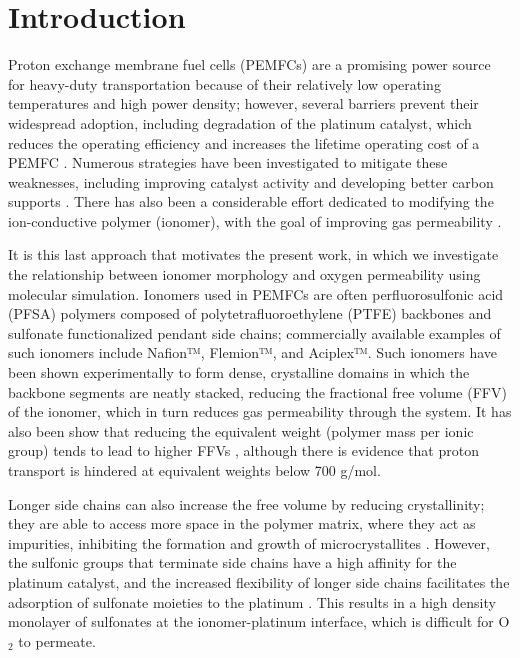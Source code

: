 \documentclass[journal=jacsat,manuscript=article]{achemso}
\begin{document}
\section{Introduction}
Proton exchange membrane fuel cells (PEMFCs) are a promising power source for heavy-duty transportation because of their relatively low operating temperatures and high power density; however, several barriers prevent their widespread adoption\cite{Cullen2021, pemfc-costing}, including degradation of the platinum catalyst, which reduces the operating efficiency and increases the lifetime operating cost of a PEMFC \cite{weber_critical_2014,braaten_studying_2020,bi_modeling_2008,ferreira_instability_2005,braaten_contaminant_2019}. Numerous strategies have been investigated to mitigate these weaknesses, including improving catalyst activity \cite{molmen_recent_2021,chandran_high-performance_2018,koh_effects_2008,he_single_2020} and developing better carbon supports \cite{ramaswamy_carbon_2020,yu_carbon-support_2009}. There has also been a considerable effort dedicated to modifying the ion-conductive polymer (ionomer), with the goal of improving gas permeability \cite{jomori_analysis_2012,Greszler_Caulk_Sinha_2012,sakai_analysis_2009,mohamed_effects_2009}. 

It is this last approach that motivates the present work, in which we investigate the relationship between ionomer morphology and oxygen permeability using molecular simulation. Ionomers used in PEMFCs are often perfluorosulfonic acid (PFSA) polymers composed of polytetrafluoroethylene (PTFE) backbones and sulfonate functionalized pendant side chains; commercially available examples of such ionomers include Nafion™, Flemion™, and Aciplex™. Such ionomers have been shown experimentally to form dense, crystalline domains in which the backbone segments are neatly stacked\cite{modestino_controlling_2012, ludvigsson_crystallinity_2000}, reducing the fractional free volume (FFV) of the ionomer, which in turn reduces gas permeability through the system. It has also been show that reducing the equivalent weight (polymer mass per ionic group) tends to lead to higher FFVs \cite{wang_evaluation_2012}, although there is evidence that proton transport is hindered at equivalent weights below 700 g/mol\cite{giffin_interplay_2013}. 

Longer side chains can also increase the free volume by reducing crystallinity; they are able to access more space in the polymer matrix, where they act as impurities, inhibiting the formation and growth of microcrystallites \cite{ghielmi_proton_2005}. However, the sulfonic groups that terminate side chains have a high affinity for the platinum catalyst, and the increased flexibility of longer side chains facilitates the adsorption of sulfonate moieties to the platinum \cite{kodama_effect_2018}. This results in a high density monolayer of sulfonates at the ionomer-platinum interface, which is difficult for O$_2$ to permeate. 
\end{document}
